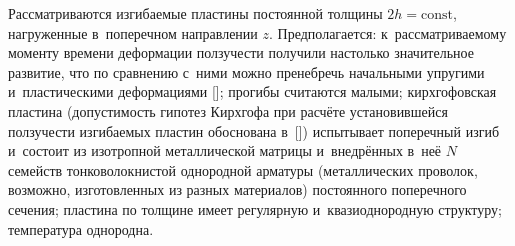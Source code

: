 Рассматриваются изгибаемые пластины постоянной толщины $2h=\text{const}$, нагруженные в~поперечном направлении $z$.
Предполагается: к~рассматриваемому моменту времени деформации ползучести получили настолько значительное развитие, что по
сравнению с~ними можно пренебречь начальными упругими и~пластическими деформациями []; прогибы считаются малыми; кирхгофовская пластина (допустимость гипотез Кирхгофа при расчёте установившейся ползучести изгибаемых пластин обоснована в~[]) испытывает поперечный изгиб и~состоит из изотропной металлической матрицы и~внедрённых в~неё $N$ семейств тонковолокнистой однородной арматуры (металлических проволок, возможно, изготовленных из разных материалов) постоянного поперечного сечения; пластина по толщине имеет регулярную и~квазиоднородную структуру; температура однородна.


